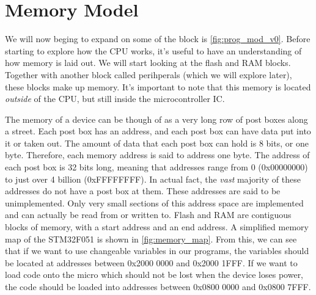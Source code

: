 \chapter{Memory Model}
We will now beging to expand on some of the block is \autoref{fig:prog_mod_v0}. Before starting to explore how the CPU works, it's useful to have an understanding of how memory is laid out. We will start looking at the flash and RAM blocks. Together with another block called perihperals (which we will explore later), these blocks make up memory. 
It's important to note that this memory is located \emph{outside} of the CPU, but still inside the microcontroller IC.

The memory of a device can be though of as a very long row of post boxes along a street. 
Each post box has an address, and each post box can have data put into it or taken out. The amount of data that each post box can hold is 8 bits, or one byte. Therefore, each memory address is said to address one byte. 
The address of each post box is 32 bits long, meaning that addresses range from 0 (0x00000000) to just over 4 billion (0xFFFFFFFF). In actual fact, the \emph{vast} majority of these addresses do not have a post box at them. These addresses are said to be unimplemented. 
Only very small sections of this address space are implemented and can actually be read from or written to.
Flash and RAM are contiguous blocks of memory, with a start address and an end address. A simplified memory map of the STM32F051 is shown in \autoref{fig:memory_map}. From this, we can see that if we want to use changeable variables in our programs, the variables should be located at addresses between 0x2000 0000 and 0x2000 1FFF. If we want to load code onto the micro which should not be lost when the device loses power, the code should be loaded into addresses between 0x0800 0000 and 0x0800 7FFF.

